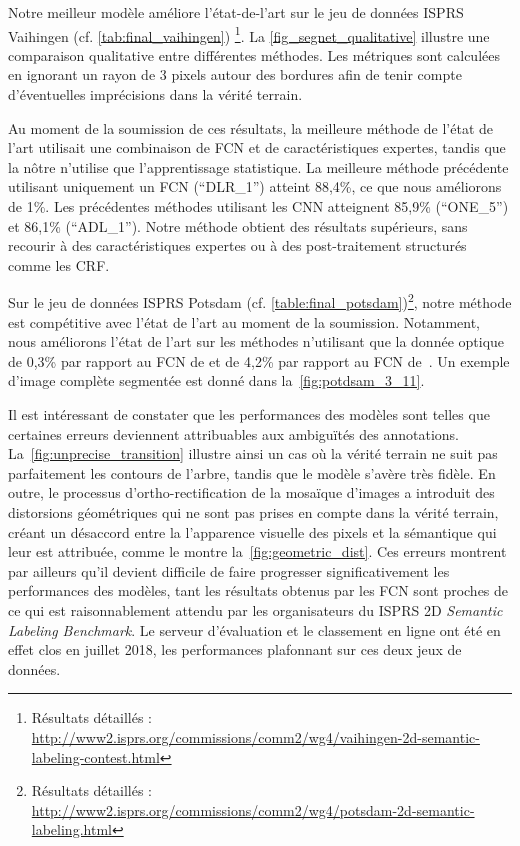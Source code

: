 Notre meilleur modèle améliore l'état-de-l'art sur le jeu de données \gls{ISPRS} Vaihingen (cf. \cref{tab:final_vaihingen}) \footnote{Résultats détaillés : \url{http://www2.isprs.org/commissions/comm2/wg4/vaihingen-2d-semantic-labeling-contest.html}}. La \cref{fig_segnet_qualitative} illustre une comparaison qualitative entre différentes méthodes. Les métriques sont calculées en ignorant un rayon de $3$ pixels autour des bordures afin de tenir compte d'éventuelles imprécisions dans la vérité terrain.

Au moment de la soumission de ces résultats, la meilleure méthode de l'état de l'art utilisait une combinaison de \gls{FCN} et de caractéristiques expertes, tandis que la nôtre n'utilise que l'apprentissage statistique. La meilleure méthode précédente utilisant uniquement un \gls{FCN} (``DLR\_1'') atteint 88,4\%, ce que nous améliorons de 1\%. Les précédentes méthodes utilisant les \gls{CNN} atteignent 85,9\% (``ONE\_5''\cite{boulch_dag_2015}) et 86,1\% (``ADL\_1''\cite{paisitkriangkrai_effective_2015}). Notre méthode obtient des résultats supérieurs, sans recourir à des caractéristiques expertes ou à des post-traitement structurés comme les \gls{CRF}.

Sur le jeu de données \gls{ISPRS} Potsdam (cf. \cref{table:final_potsdam})\footnote{Résultats détaillés : \url{http://www2.isprs.org/commissions/comm2/wg4/potsdam-2d-semantic-labeling.html}}, notre méthode est compétitive avec l'état de l'art au moment de la soumission. Notamment, nous améliorons l'état de l'art sur les méthodes n'utilisant que la donnée optique de 0,3\% par rapport au \gls{FCN} de \citet{sherrah_fully_2016} et de 4,2\% par rapport au \gls{FCN} de~\citet{volpi_dense_2017}. Un exemple d'image complète segmentée est donné dans la~\cref{fig:potdsam_3_11}.

Il est intéressant de constater que les performances des modèles sont telles que certaines erreurs deviennent attribuables aux ambiguïtés des annotations. La~\cref{fig:unprecise_transition} illustre ainsi un cas où la vérité terrain ne suit pas parfaitement les contours de l'arbre, tandis que le modèle s'avère très fidèle. En outre, le processus d'ortho-rectification de la mosaïque d'images a introduit des distorsions géométriques qui ne sont pas prises en compte dans la vérité terrain, créant un désaccord entre la l'apparence visuelle des pixels et la sémantique qui leur est attribuée, comme le montre la~\cref{fig:geometric_dist}. Ces erreurs montrent par ailleurs qu'il devient difficile de faire progresser significativement les performances des modèles, tant les résultats obtenus par les \gls{FCN} sont proches de ce qui est raisonnablement attendu par les organisateurs du \gls{ISPRS} 2D \emph{Semantic Labeling Benchmark}. Le serveur d'évaluation et le classement en ligne ont été en effet clos en juillet 2018, les performances plafonnant sur ces deux jeux de données.


